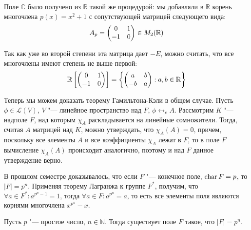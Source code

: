 \begin{note}
	Поле $\mathbb{C}$ было получено из $\mathbb{R}$ такой же процедурой: мы добавляли в $\mathbb{R}$ корень многочлена $p(x) = x^2 + 1$ с сопутствующей матрицей следующего вида:
	\[A_p = \begin{pmatrix}0&1\\-1&0\end{pmatrix} \in M_2(\mathbb{R})\]
	
	Так как уже во второй степени эта матрица дает $-E$, можно считать, что все многочлены имеют степень не выше первой:
	\[\mathbb{R}\left[\begin{pmatrix}0&1\\-1&0\end{pmatrix}\right] = \left\{\begin{pmatrix}a&b\\-b&a\end{pmatrix} : a, b \in \mathbb{R}\right\}\]
\end{note}

\begin{note}
	Теперь мы можем доказать теорему Гамильтона-Кэли в общем случае. Пусть $\phi \in \mathcal{L}(V)$, $V$ "--- линейное пространство над $F$, $\phi \leftrightarrow_e A$. Рассмотрим $K$ "--- надполе $F$, над которым $\chi_A$ раскладывается на линейные сомножители. \pagebreak Тогда, считая $A$ матрицей над $K$, можно утверждать, что $\chi_A(A) = 0$, причем, поскольку все элементы $A$ и все коэффициенты $\chi_A$ лежат в $F$, то в поле $F$ вычисление $\chi_A(A)$ происходит аналогично, поэтому и над $F$ данное утверждение верно.
\end{note}

\begin{note}
	В прошлом семестре доказывалось, что если $F$ "--- конечное поле, $\operatorname{char}{F} = p$, то $|F| = p^n$. Применяя теорему Лагранжа к группе $F^*$, получим, что $\forall a \in F^*: a^{p^n - 1} = 1$, тогда $\forall a \in F: a^{p^n} = a$, то есть все элементы поля являются корнями многочлена $x^{p^n} - x$.
\end{note}

\begin{theorem}
	Пусть $p$ "--- простое число, $n \in \mathbb{N}$. Тогда существует поле $F$ такое, что $|F| = p^n$.
\end{theorem}

